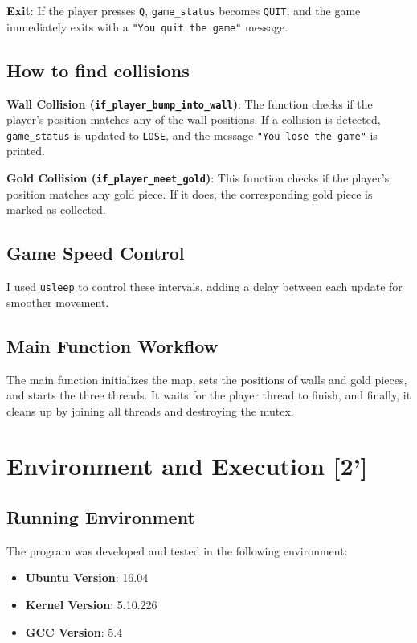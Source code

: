 \documentclass{article}
\begin{document}
\textbf{Exit}: If the player presses \texttt{Q}, \texttt{game\_status} becomes \texttt{QUIT}, and the game immediately exits with a \texttt{"You quit the game"} message.

\subsection{How to find collisions}
\textbf{Wall Collision (\texttt{if\_player\_bump\_into\_wall})}: The function checks if the player's position matches any of the wall positions. If a collision is detected, \texttt{game\_status} is updated to \texttt{LOSE}, and the message \texttt{"You lose the game"} is printed.

\textbf{Gold Collision (\texttt{if\_player\_meet\_gold})}: This function checks if the player's position matches any gold piece. If it does, the corresponding gold piece is marked as collected.

\subsection{Game Speed Control}
I used \texttt{usleep} to control these intervals, adding a delay between each update for smoother movement.

\subsection{Main Function Workflow}
The main function initializes the map, sets the positions of walls and gold pieces, and starts the three threads. It waits for the player thread to finish, and finally, it cleans up by joining all threads and destroying the mutex.


\section{Environment and Execution [2']}
\subsection{Running Environment}
The program was developed and tested in the following environment:
\begin{itemize}
    \item \textbf{Ubuntu Version}: 16.04
    \item \textbf{Kernel Version}: 5.10.226
    \item \textbf{GCC Version}: 5.4
\end{itemize}
\end{document}
